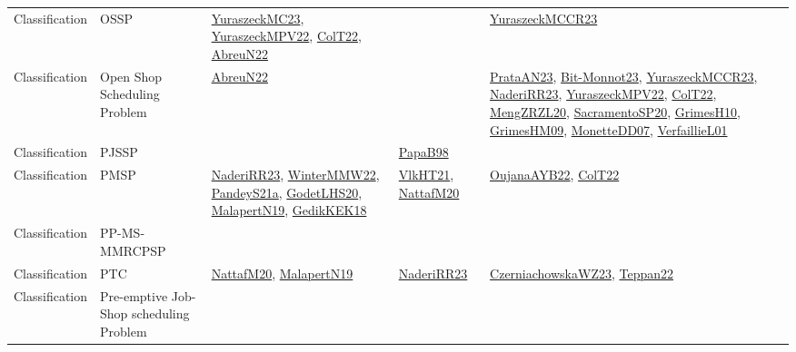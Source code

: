 {\begin{longtable}{lp{3cm}>{\raggedright}p{6cm}>{\raggedright}p{6cm}p{8cm}}
Classification & OSSP & \href{papers/YuraszeckMC23.pdf}{YuraszeckMC23}\cite{YuraszeckMC23}, \href{articles/YuraszeckMPV22.pdf}{YuraszeckMPV22}\cite{YuraszeckMPV22}, \href{articles/ColT22.pdf}{ColT22}\cite{ColT22}, \href{articles/AbreuN22.pdf}{AbreuN22}\cite{AbreuN22} &  & \href{articles/YuraszeckMCCR23.pdf}{YuraszeckMCCR23}\cite{YuraszeckMCCR23}\\
Classification & Open Shop Scheduling Problem & \href{articles/AbreuN22.pdf}{AbreuN22}\cite{AbreuN22} &  & \href{articles/PrataAN23.pdf}{PrataAN23}\cite{PrataAN23}, \href{papers/Bit-Monnot23.pdf}{Bit-Monnot23}\cite{Bit-Monnot23}, \href{articles/YuraszeckMCCR23.pdf}{YuraszeckMCCR23}\cite{YuraszeckMCCR23}, \href{articles/NaderiRR23.pdf}{NaderiRR23}\cite{NaderiRR23}, \href{articles/YuraszeckMPV22.pdf}{YuraszeckMPV22}\cite{YuraszeckMPV22}, \href{articles/ColT22.pdf}{ColT22}\cite{ColT22}, \href{articles/MengZRZL20.pdf}{MengZRZL20}\cite{MengZRZL20}, \href{articles/SacramentoSP20.pdf}{SacramentoSP20}\cite{SacramentoSP20}, \href{papers/GrimesH10.pdf}{GrimesH10}\cite{GrimesH10}, \href{papers/GrimesHM09.pdf}{GrimesHM09}\cite{GrimesHM09}, \href{papers/MonetteDD07.pdf}{MonetteDD07}\cite{MonetteDD07}, \href{papers/VerfaillieL01.pdf}{VerfaillieL01}\cite{VerfaillieL01}\\
Classification & PJSSP &  & \href{articles/PapaB98.pdf}{PapaB98}\cite{PapaB98} & \\
Classification & PMSP & \href{articles/NaderiRR23.pdf}{NaderiRR23}\cite{NaderiRR23}, \href{papers/WinterMMW22.pdf}{WinterMMW22}\cite{WinterMMW22}, \href{articles/PandeyS21a.pdf}{PandeyS21a}\cite{PandeyS21a}, \href{papers/GodetLHS20.pdf}{GodetLHS20}\cite{GodetLHS20}, \href{papers/MalapertN19.pdf}{MalapertN19}\cite{MalapertN19}, \href{articles/GedikKEK18.pdf}{GedikKEK18}\cite{GedikKEK18} & \href{articles/VlkHT21.pdf}{VlkHT21}\cite{VlkHT21}, \href{papers/NattafM20.pdf}{NattafM20}\cite{NattafM20} & \href{papers/OujanaAYB22.pdf}{OujanaAYB22}\cite{OujanaAYB22}, \href{articles/ColT22.pdf}{ColT22}\cite{ColT22}\\
Classification & PP-MS-MMRCPSP &  &  & \\
Classification & PTC & \href{papers/NattafM20.pdf}{NattafM20}\cite{NattafM20}, \href{papers/MalapertN19.pdf}{MalapertN19}\cite{MalapertN19} & \href{articles/NaderiRR23.pdf}{NaderiRR23}\cite{NaderiRR23} & \href{articles/CzerniachowskaWZ23.pdf}{CzerniachowskaWZ23}\cite{CzerniachowskaWZ23}, \href{papers/Teppan22.pdf}{Teppan22}\cite{Teppan22}\\
Classification & Pre-emptive Job-Shop scheduling Problem &  &  & \\

\end{longtable}}
